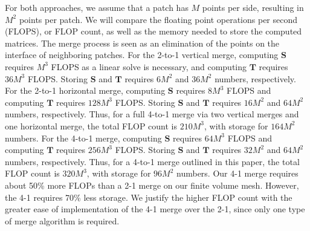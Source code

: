 For both approaches, we assume that a patch has $M$ points per side, resulting in $M^2$ points per patch. We will compare the floating point operations per second (FLOPS), or FLOP count, as well as the memory needed to store the computed matrices. The merge process is seen as an elimination of the points on the interface of neighboring patches. For the 2-to-1 vertical merge, computing $\mathbf{S}$ requires $M^3$ FLOPS as a linear solve is necessary, and computing $\mathbf{T}$ requires $36M^3$ FLOPS. Storing $\mathbf{S}$ and $\mathbf{T}$ requires $6M^2$ and $36M^2$ numbers, respectively. For the 2-to-1 horizontal merge, computing $\mathbf{S}$ requires $8M^3$ FLOPS and computing $\mathbf{T}$ requires $128M^3$ FLOPS. Storing $\mathbf{S}$ and $\mathbf{T}$ requires $16M^2$ and $64M^2$ numbers, respectively. Thus, for a full 4-to-1 merge via two vertical merges and one horizontal merge, the total FLOP count is $210M^3$, with storage for $164M^2$ numbers. For the 4-to-1 merge, computing $\mathbf{S}$ requires $64M^3$ FLOPS and computing $\mathbf{T}$ requires $256M^3$ FLOPS. Storing $\mathbf{S}$ and $\mathbf{T}$ requires $32M^2$ and $64M^2$ numbers, respectively. Thus, for a 4-to-1 merge outlined in this paper, the total FLOP count is $320M^3$, with storage for $96M^2$ numbers.  Our 4-1 merge requires about 50\% more FLOPs  than a 2-1 merge on our finite volume mesh.  However, the 4-1 requires 70\% less storage.  We justify the higher FLOP count with the greater ease of implementation of the 4-1 merge over the 2-1, since only one type of merge algorithm is required.  
